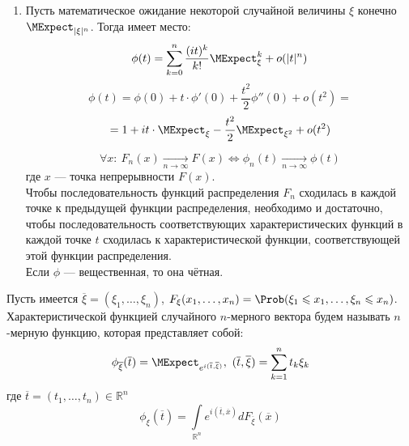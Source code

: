 \begin{enumerate}[wide, labelwidth=!, labelindent=0pt]
\item Пусть математическое ожидание некоторой случайной величины $\xi$ конечно $\MExpect_{|\xi|^n}$. Тогда имеет место:
\[
	\phi(t) = \sum\limits_{k = 0}^{n} \frac{(it)^k}{k!} \MExpect_{\xi}^k + o(|t|^n)
\]
\[
	\phi(t) = \phi(0) + t \cdot \phi'(0) + \frac{t^2}{2} \phi''(0) + o(t^2) = 
\]
\[
	= 1 + it \cdot \MExpect_{\xi} - \frac{t^2}{2} \MExpect_{\xi^2} + o(t^2)
\]

\begin{theorem}
	\[
		\forall x: \ F_n (x) \underset{n \to \infty}{\rightarrow} F(x) \Leftrightarrow \phi_n (t) \underset{n \to \infty}{\rightarrow} \phi(t)
	\]
где $x$ --- точка непрерывности $F(x)$. \\
Чтобы последовательность функций распределения $F_n$ сходилась в каждой точке к предыдущей функции распределения, необходимо и достаточно, чтобы последовательность соответствующих характеристических функций в каждой точке $t$ сходилась к характеристической функции, соответствующей этой функции распределения. \\
Если $\phi$ --- вещественная, то она чётная.
\end{theorem}
\end{enumerate}
\begin{definition}
	Пусть имеется $\overline{\xi} = (\xi_1, \ldots, \xi_n)$, $F_{\xi} (x_1, \ldots, x_n) = \Prob(\xi_1 \leqslant x_1, \ldots, \xi_n \leqslant x_n)$. Характеристической функцией случайного $n$-мерного вектора будем называть $n$-мерную функцию, которая представляет собой:
\[
	\phi_{\overline{\xi}} (\overline{t}) = \MExpect_{e^{i(\overline{t}, \overline{\xi})}}, \ (\overline{t}, \overline{\xi}) = \sum\limits_{k = 1}^{n} t_k \xi_k
\]
где $\overline{t} = (t_1, \ldots, t_n) \in \mathbb{R}^n$
\[
	\phi_{\xi} (\overline{t}) = \int\limits_{\mathbb{R}^n} e^{i(\overline{t}, \overline{x})} d F_{\overline{\xi}} (\overline{x})
\]
\end{definition}
